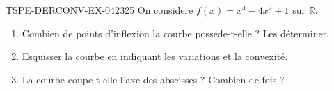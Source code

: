 \begin{exercice}{TSPE-DERCONV-EX-042}{3}{25}
On considere $f(x) = x^4 - 4x^2 + 1$ sur $\mathbb{R}$.
\begin{enumerate}
  \item Combien de points d'inflexion la courbe possede-t-elle ? Les déterminer.
  \item Esquisser la courbe en indiquant les variations et la convexité.
  \item La courbe coupe-t-elle l'axe des abscisses ? Combien de fois ?
\end{enumerate}

\end{exercice}
